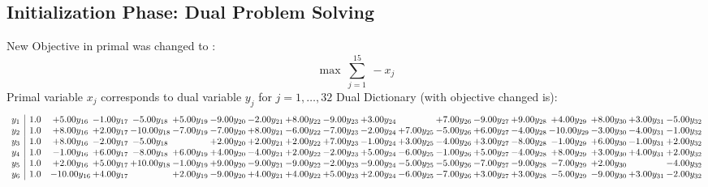 \documentclass[9pt]{article}
\begin{document}
\subsection{Initialization Phase: Dual Problem Solving}
New Objective in primal was changed to : \[ \max\ \sum_{j=1}^{15}\ - x_j \] 
Primal variable $x_j$ corresponds to dual variable $y_j$ for $j = 1,\ldots,32$
Dual Dictionary (with objective changed is): 
\[\begin{array}{c| c c@{\hskip 2pt} c@{\hskip 2pt} c@{\hskip 2pt} c@{\hskip 2pt} c@{\hskip 2pt} c@{\hskip 2pt} c@{\hskip 2pt} c@{\hskip 2pt} c@{\hskip 2pt} c@{\hskip 2pt} c@{\hskip 2pt} c@{\hskip 2pt} c@{\hskip 2pt} c@{\hskip 2pt} c@{\hskip 2pt} c@{\hskip 2pt} c@{\hskip 2pt} }
 y_{1}   &  1.0 & +  5.00 y_{16} & -1.00 y_{17} & -5.00 y_{18} & +  5.00 y_{19} & -9.00 y_{20} & -2.00 y_{21} & +  8.00 y_{22} & -9.00 y_{23} & +  3.00 y_{24} &   & +  7.00 y_{26} & -9.00 y_{27} & +  9.00 y_{28} & +  4.00 y_{29} & +  8.00 y_{30} & +  3.00 y_{31} & -5.00 y_{32}\\
 y_{2}   &  1.0 & +  8.00 y_{16} & +  2.00 y_{17} & -10.00 y_{18} & -7.00 y_{19} & -7.00 y_{20} & +  8.00 y_{21} & -6.00 y_{22} & -7.00 y_{23} & -2.00 y_{24} & +  7.00 y_{25} & -5.00 y_{26} & +  6.00 y_{27} & -4.00 y_{28} & -10.00 y_{29} & -3.00 y_{30} & -4.00 y_{31} & -1.00 y_{32}\\
 y_{3}   &  1.0 & +  8.00 y_{16} & -2.00 y_{17} & -5.00 y_{18} &   & +  2.00 y_{20} & +  2.00 y_{21} & +  2.00 y_{22} & +  7.00 y_{23} & -1.00 y_{24} & +  3.00 y_{25} & -4.00 y_{26} & +  3.00 y_{27} & -8.00 y_{28} & -1.00 y_{29} & +  6.00 y_{30} & -1.00 y_{31} & +  2.00 y_{32}\\
 y_{4}   &  1.0 & -1.00 y_{16} & +  6.00 y_{17} & -8.00 y_{18} & +  6.00 y_{19} & +  4.00 y_{20} & -4.00 y_{21} & +  2.00 y_{22} & -2.00 y_{23} & +  5.00 y_{24} & -6.00 y_{25} & -1.00 y_{26} & +  5.00 y_{27} & -4.00 y_{28} & +  8.00 y_{29} & +  3.00 y_{30} & +  4.00 y_{31} & +  2.00 y_{32}\\
 y_{5}   &  1.0 & +  2.00 y_{16} & +  5.00 y_{17} & + 10.00 y_{18} & -1.00 y_{19} & +  9.00 y_{20} & -9.00 y_{21} & -9.00 y_{22} & -2.00 y_{23} & -9.00 y_{24} & -5.00 y_{25} & -5.00 y_{26} & -7.00 y_{27} & -9.00 y_{28} & -7.00 y_{29} & +  2.00 y_{30} &   & -4.00 y_{32}\\
 y_{6}   &  1.0 & -10.00 y_{16} & +  4.00 y_{17} &   & +  2.00 y_{19} & -9.00 y_{20} & +  4.00 y_{21} & +  4.00 y_{22} & +  5.00 y_{23} & +  2.00 y_{24} & -6.00 y_{25} & -7.00 y_{26} & +  3.00 y_{27} & +  3.00 y_{28} & -5.00 y_{29} & -9.00 y_{30} & +  3.00 y_{31} & -2.00 y_{32}\\

\end{array}\]
\end{document}
